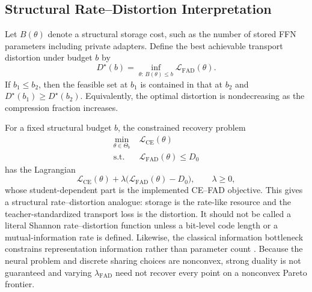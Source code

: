 \documentclass{article}
\newcommand{\calL}{\mathcal{L}}
\newcommand{\FAD}{\mathrm{FAD}}
\newcommand{\CE}{\mathrm{CE}}
\theoremstyle{plain}
\theoremstyle{definition}
\theoremstyle{remark}
\begin{document}
\subsection{Structural Rate--Distortion Interpretation}
\label{app:rate-distortion}

Let $B(\theta)$ denote a structural storage cost, such as the number of stored FFN
parameters including private adapters.  Define the best achievable transport
distortion under budget $b$ by
\begin{equation}
  D^\star(b)=\inf_{\theta:\,B(\theta)\le b}\calL_{\FAD}(\theta).
  \label{eq:app-structural-distortion-curve}
\end{equation}
If $b_1\le b_2$, then the feasible set at $b_1$ is contained in that at $b_2$ and
$D^\star(b_1)\ge D^\star(b_2)$.  Equivalently, the optimal distortion is
nondecreasing as the compression fraction increases.

For a fixed structural budget $b$, the constrained recovery problem
\begin{equation}
\begin{aligned}
  \min_{\theta\in\Theta_b}\;&\calL_{\CE}(\theta)\\
  \text{s.t.}\;&\calL_{\FAD}(\theta)\le D_0
  \label{eq:app-constrained-recovery}
\end{aligned}
\end{equation}
has the Lagrangian
\begin{equation}
  \calL_{\CE}(\theta)
  +\lambda\bigl(\calL_{\FAD}(\theta)-D_0\bigr),
  \qquad \lambda\ge0,
  \label{eq:app-recovery-lagrangian}
\end{equation}
whose student-dependent part is the implemented CE--FAD objective.  This gives a
structural rate--distortion analogue: storage is the rate-like resource and the
teacher-standardized transport loss is the distortion.  It should not be called a
literal Shannon rate--distortion function unless a bit-level code length or a
mutual-information rate is defined.  Likewise, the classical information
bottleneck constrains representation information rather than parameter count
\citep{tishby2000information}.  Because the neural problem and discrete sharing
choices are nonconvex, strong duality is not guaranteed and varying
$\lambda_{\FAD}$ need not recover every point on a nonconvex Pareto frontier.

\end{document}

